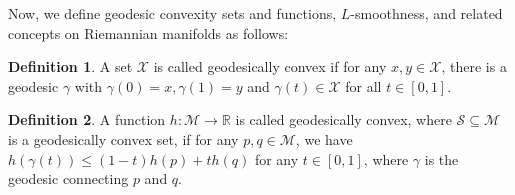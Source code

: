 \documentclass[pdflatex,sn-mathphys-num]{sn-jnl}%
\theoremstyle{definition} %
\newtheorem{definition}{Definition}[section] %
\theoremstyle{remark} %
\begin{document}
Now, we define geodesic convexity sets and functions, \(L\)-smoothness, and related concepts on Riemannian manifolds as follows:



\begin{definition}\cite{Boumal_2023}
    A set $\mathcal{X}$ is called geodesically convex if for any $x, y \in \mathcal{X}$, there is a geodesic $\gamma$ with $\gamma(0)=x, \gamma(1)=y$ and $\gamma(t) \in \mathcal{X}$ for all $t \in[0,1]$.
\end{definition}

\begin{definition}
    A function $h \colon \mathcal{M} \rightarrow \mathbb{R}$ is called geodesically convex, where $\mathcal{S}\subseteq \mathcal{M}$ is a geodesically convex set, if for any $p, q \in \mathcal{M}$, we have $h(\gamma(t)) \leq(1-t) h(p)+t h(q)$ for any $t \in[0,1]$, where $\gamma$ is the geodesic connecting $p$ and $q$.
\end{definition}
\end{document}
